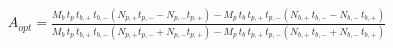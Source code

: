 


\begin{eqnarray*}
  A_{opt} = \frac{
M_b\,t_p\,t_{b,+}\,t_{b,-} \left( N_{p,+} t_{p,-} - N_{p,-} t_{p,+}\right) - M_p\,t_b\,t_{p,+}\,t_{p,-} \left( N_{b,+}\, t_{b,-} - N_{b,-}\,t_{b,+}\right)}
{M_b\,t_p\,t_{b,+}\,t_{b,-} \left( N_{p,+} t_{p,-} + N_{p,-} t_{p,+}\right) - M_p\,t_b\,t_{p,+}\,t_{p,-} \left( N_{b,+}\, t_{b,-} + N_{b,-}\,t_{b,+}\right)}
\end{eqnarray*}

